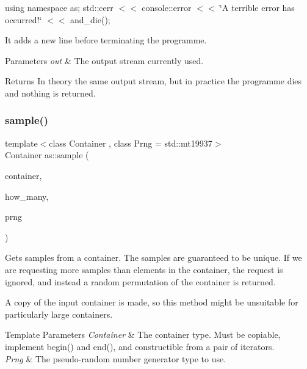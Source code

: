 using namespace as; std\+::cerr $<$$<$ console\+::error $<$$<$ \char`\"{}\+A terrible error has occurred!\char`\"{} $<$$<$ and\+\_\+die();

It adds a new line before terminating the programme.


\begin{DoxyParams}{Parameters}
{\em out} & The output stream currently used. \\
\hline
\end{DoxyParams}
\begin{DoxyReturn}{Returns}
In theory the same output stream, but in practice the programme dies and nothing is returned. 
\end{DoxyReturn}
\mbox{\label{namespaceas_a001b8303767234a8c93de5cb530a8f3d}} 
\subsubsection{\texorpdfstring{sample()}{sample()}\hspace{0.1cm}{\footnotesize\ttfamily [1/2]}}
{\footnotesize\ttfamily template$<$class Container , class Prng  = std\+::mt19937$>$ \\
Container as\+::sample (\begin{DoxyParamCaption}\item[{const Container}]{container,  }\item[{typename Container\+::size\+\_\+type}]{how\+\_\+many,  }\item[{Prng \&\&}]{prng }\end{DoxyParamCaption})\hspace{0.3cm}{\ttfamily [inline]}}



Gets samples from a container. The samples are guaranteed to be unique. If we are requesting more samples than elements in the container, the request is ignored, and instead a random permutation of the container is returned. 

A copy of the input container is made, so this method might be unsuitable for particularly large containers.


\begin{DoxyTemplParams}{Template Parameters}
{\em Container} & The container type. Must be copiable, implement begin() and end(), and constructible from a pair of iterators. \\
\hline
{\em Prng} & The pseudo-\/random number generator type to use. \\
\hline
\end{DoxyTemplParams}

